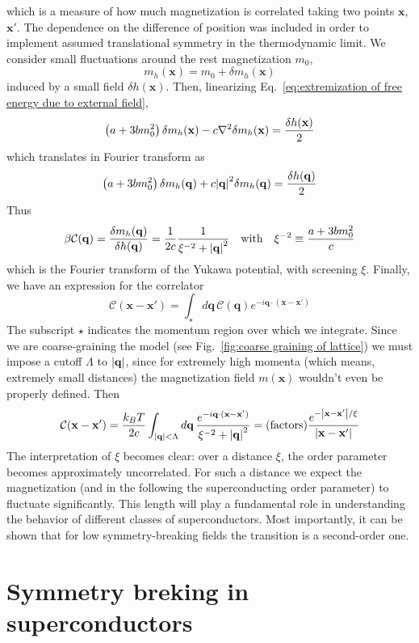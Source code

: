 which is a measure of how much magnetization is correlated taking two points $\mathbf{x}$, $\mathbf{x}'$. The dependence on the difference of position was included in order to implement assumed translational symmetry in the thermodynamic limit. We consider small fluctuations around the rest magnetization $m_0$,
\[
    m_h (\mathbf{x}) = m_0 + \delta m_h (\mathbf{x}) 
\]
induced by a small field $\delta h(\mathbf{x})$. Then, linearizing Eq.~\eqref{eq:extremization of free energy due to external field},
\[
    \lrR{ a + 3b m_0^2 } \delta m_h (\mathbf{x}) - c \laplacian \delta m_h (\mathbf{x}) = \frac{\delta h(\mathbf{x})}{2} 
\]
which translates in Fourier transform as
\[
    \left({ a + 3b m_0^2 }\right) \delta m_h (\mathbf{q}) + c \abs{\mathbf{q}}^2 \delta m_h (\mathbf{q}) = \frac{\delta h(\mathbf{q})}{2} 
\]
Thus
\[
    \beta \mathcal{C} (\mathbf{q}) =
    \fdv{m_h(\mathbf{q})}{h(\mathbf{q})} = \frac{1}{2c} \frac{1}{\xi^{-2} + \abs{\mathbf{q}}^2}
    \qq{with}
    \xi^{-2} \equiv \frac{a + 3b m_0^2}{c}
\]
which is the Fourier transform of the Yukawa potential, with screening $\xi$. Finally, we have an expression for the correlator
\[
    \mathcal{C} (\mathbf{x} - \mathbf{x}') = \int_{\star} d\mathbf{q} \, \mathcal{C} (\mathbf{q}) e^{-i \mathbf{q} \cdot (\mathbf{x} - \mathbf{x}')}
\]
The subscript $\star$ indicates the momentum region over which we integrate. Since we are coarse-graining the model (see Fig.~\ref{fig:coarse graining of lattice}) we must impose a cutoff $\Lambda$ to $\abs{\mathbf{q}}$, since for extremely high momenta (which means, extremely small distances) the magnetization field $m(\mathbf{x})$ wouldn't even be properly defined. Then
\[
    \mathcal{C} (\mathbf{x} - \mathbf{x}') = \frac{k_B T}{2c} \int_{\abs{\mathbf{q}}<\Lambda} d\mathbf{q} \, \frac{e^{-i \mathbf{q} \cdot (\mathbf{x} - \mathbf{x}')}}{\xi^{-2} + \abs{\mathbf{q}}^2} = (\mathrm{factors}) \frac{e^{-\abs{\mathbf{x}-\mathbf{x}'}/\xi}}{\abs{\mathbf{x}-\mathbf{x}'}}
\]
The interpretation of $\xi$ becomes clear: over a distance $\xi$, the order parameter becomes approximately uncorrelated. For such a distance we expect the magnetization (and in the following the superconducting order parameter) to fluctuate significantly. This length will play a fundamental role in understanding the behavior of different classes of superconductors. Most importantly, it can be shown that for low symmetry-breaking fields the transition is a second-order one.

\section{Symmetry breking in superconductors}

